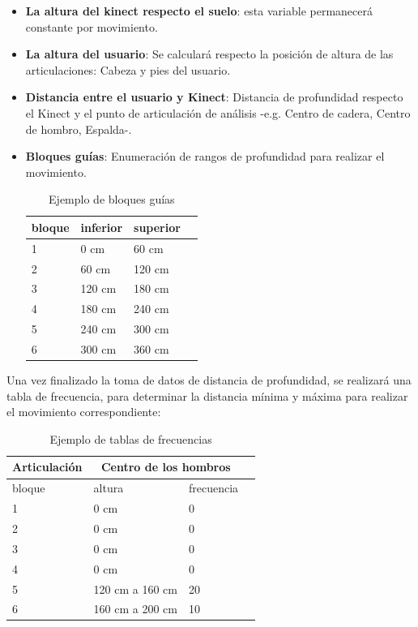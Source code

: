 \documentclass[twoside,twocolumn]{article}
\begin{document}
\begin{itemize}
\item \textbf{La altura del kinect respecto el suelo}: esta variable permanecerá constante por movimiento.
\item \textbf{La altura del usuario}: Se calculará respecto la posición de altura de las articulaciones: Cabeza y pies del usuario.
\item \textbf{Distancia entre el usuario y Kinect}: Distancia de profundidad respecto el Kinect y el punto de articulación de análisis -e.g. Centro de cadera, Centro de hombro, Espalda-.
\item \textbf{Bloques guías}: Enumeración de rangos de profundidad para realizar el movimiento.
\begin{table}[H]
\caption{Ejemplo de bloques guías}
\centering
\begin{tabular}{lllr}
\toprule
bloque & inferior & superior  \\
\midrule
1 & 0 cm  & 60 cm             \\
2 & 60 cm & 120 cm            \\
3 & 120 cm & 180 cm           \\
4 & 180 cm & 240 cm           \\
5 & 240 cm & 300 cm           \\
6 & 300 cm & 360 cm           \\
\bottomrule
\end{tabular}
\end{table}
\end{itemize}
\medbreak 
Una vez finalizado la toma de datos de distancia de profundidad, se realizará una tabla de frecuencia, para determinar la distancia mínima y máxima para realizar el movimiento correspondiente:
\begin{table}[H]
\caption{Ejemplo de tablas de frecuencias}
\centering
\begin{tabular}{lllr}
\toprule
Articulación & \multicolumn{2}{c}{Centro de los hombros} \\
\midrule
bloque & altura & frecuencia \\
1 & 0 cm & 0             \\
2 & 0 cm & 0             \\
3 & 0 cm & 0		     \\ 
4 & 0 cm & 0       \\
5 & 120 cm a 160 cm & 20 \\
6 & 160 cm a 200 cm & 10 \\
\bottomrule
\end{tabular}
\end{table}
\end{document}
